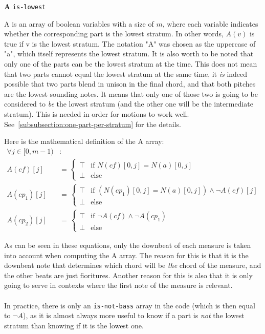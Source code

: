 \vspace{.5cm} \noindent \textbf{A} \hspace{.cm} \texttt{is-lowest} \label{is-lowest}

A is an array of boolean variables with a size of $m$, where each variable indicates whether the corresponding part is the lowest stratum. In other words, $A(v)$ is true if v is the lowest stratum. The notation "A" was chosen as the uppercase of "a", which itself represents the lowest stratum. 
It is also worth to be noted that only one of the parts can be the lowest stratum at the time. This does not mean that two parts cannot equal the lowest stratum at the same time, it \textit{is} indeed possible that two parts blend in unison in the final chord, and that both pitches are the lowest sounding notes. It means that only one of those two is going to be considered to \textit{be} the lowest stratum (and the other one will be the intermediate stratum). This is needed in order for motions to work well. See~\ref{subsubsection:one-part-per-stratum} for the details.

Here is the mathematical definition of the A array:
\begin{equation}
\begin{aligned}
\forall j \in [0, m-1)& \colon  \\
A(\mathit{cf})[j] &= \,  
\begin{cases}
    \top & \text{if } N(cf)[0,j] = N(a)[0,j] \\
    \bot & \text{else }
\end{cases}\\
A(cp_1)[j] &= \,  
\begin{cases}
    \top & \text{if } (N(cp_1)[0,j] = N(a)[0,j]) \land \neg A(\mathit{cf})[j] \\
    \bot & \text{else }
\end{cases}\\
A(cp_2)[j] &= \,  
\begin{cases}
    \top & \text{if } \neg A(\mathit{cf}) \land \neg A(cp_1)\\
    \bot & \text{else }
\end{cases}
\end{aligned}
\end{equation}

As can be seen in these equations, only the downbeat of each measure is taken into account when computing the A array. The reason for this is that it is the downbeat note that determines which chord will be \textit{the} chord of the measure, and the other beats are just fioritures. Another reason for this is also that it is only going to serve in contexts where the first note of the measure is relevant.

\paragraph{}
In practice, there is only an \texttt{is-not-bass} array in the code (which is then equal to $\neg A$), as it is almost always more useful to know if a part is \textit{not} the lowest stratum than knowing if it is the lowest one. 

